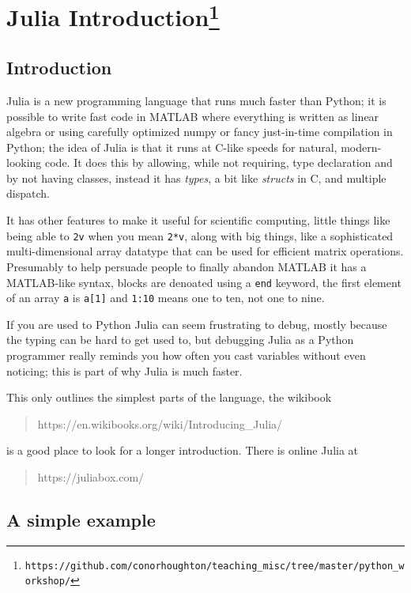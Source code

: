 \documentclass[11pt,a4paper]{scrartcl}
\begin{document}
\section*{Julia Introduction\footnote{\texttt{https://github.com/conorhoughton/teaching\_misc/tree/master/python\_workshop/}}}
\subsection*{Introduction}
Julia is a new programming language that runs much faster than Python;
it is possible to write fast code in MATLAB where everything is
written as linear algebra or using carefully optimized numpy or fancy
just-in-time compilation in Python; the idea of Julia is that it runs
at C-like speeds for natural, modern-looking code. It does this by
allowing, while not requiring, type declaration and by not having
classes, instead it has \textsl{types}, a bit like \textsl{structs} in
C, and multiple dispatch. 

It has other features to make it useful for scientific computing,
little things like being able to \texttt{2v} when you mean
\texttt{2*v}, along with big things, like a sophisticated
multi-dimensional array datatype that can be used for efficient matrix
operations. Presumably to help persuade people to finally abandon
MATLAB it has a MATLAB-like syntax, blocks are denoated using a
\texttt{end} keyword, the first element of an array \texttt{a} is
\texttt{a[1]} and \texttt{1:10} means one to ten, not one to nine.

If you are used to Python Julia can seem frustrating to debug, mostly
because the typing can be hard to get used to, but debugging Julia as
a Python programmer really reminds you how often you cast variables
without even noticing; this is part of why Julia is much faster.

This only outlines the simplest parts of the language, the wikibook
\begin{quote}
https://en.wikibooks.org/wiki/Introducing\_Julia/
\end{quote}
is a good place to look for a longer introduction. There is online Julia at
\begin{quote}
https://juliabox.com/
\end{quote}

\subsection*{A simple example}
\end{document}
